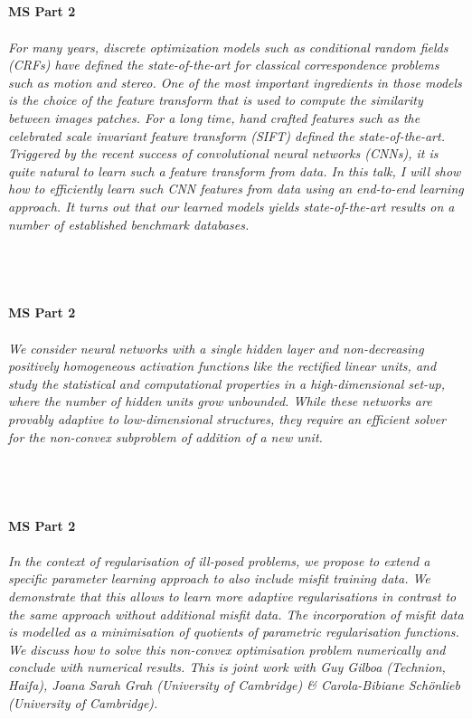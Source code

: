\begin{multicols}{2}
\\ 
    \\
    \\\\
    \noindent\textbf{MS Part 2}\\
\\  
    \textit{For many years, discrete optimization models such as conditional random fields (CRFs) have defined the state-of-the-art for classical correspondence problems such as motion and stereo. One of the most important ingredients in those models is the choice of the feature transform that is used to compute the similarity between images patches. For a long time, hand crafted features such as the celebrated scale invariant feature transform (SIFT) defined the state-of-the-art. Triggered by the recent success of convolutional neural networks (CNNs), it is quite natural to learn such a feature transform from data. In this talk, I will show how to efficiently learn such CNN features from data using an end-to-end learning approach. It turns out that our learned models yields state-of-the-art results on a number of established benchmark databases.}\\
\\ 
    \\
    \\\\
    \noindent\textbf{MS Part 2}\\
\\  
    \textit{We consider neural networks with a single hidden layer and non-decreasing positively homogeneous activation functions like the rectified linear units, and study the statistical and computational properties in a high-dimensional set-up, where the number of hidden units grow unbounded. While these networks are provably adaptive to low-dimensional structures, they require an efficient solver for the non-convex subproblem of addition of a new unit.}\\
\\ 
    \\
    \\\\
    \noindent\textbf{MS Part 2}\\
\\  
    \textit{In the context of regularisation of ill-posed problems, we propose to extend a specific parameter learning approach to also include misfit training data. We demonstrate that this allows to learn more adaptive regularisations in contrast to the same approach without additional misfit data. The incorporation of misfit data is modelled as a minimisation of quotients of parametric regularisation functions. We discuss how to solve this non-convex optimisation problem numerically and conclude with numerical results.  This is joint work with Guy Gilboa (Technion, Haifa), Joana Sarah Grah (University of Cambridge) \& Carola-Bibiane Schönlieb (University of Cambridge).}\\

\end{multicols}
